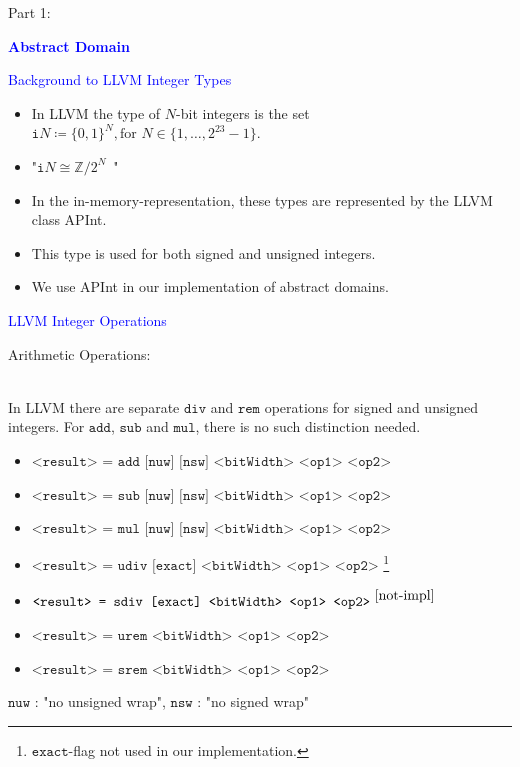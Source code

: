 \begin{frame}

Part 1:
\vspace{0.2cm}

{\LARGE \textbf{\textcolor{blue}{Abstract Domain}}}

\end{frame}




\begin{frame}[fragile]{\textcolor{blue}{Background to LLVM Integer Types}}
\begin{itemize}
\item In LLVM the type of $N$-bit integers is the set $\texttt{i}N \coloneqq \{0,1\}^N, \text{for~} N \in \{1,\dots, 2^{23}-1\}$.
\item "$\texttt{i}N \cong \mathbb{Z}/2^N$~" 
\item In the in-memory-representation, these types are represented by the LLVM class APInt.
\item This type is used for both signed and unsigned integers.
 
\item We use APInt 	 in our implementation of abstract domains.

\end{itemize}

\end{frame}

\begin{frame}[fragile]{\textcolor{blue}{LLVM Integer Operations}}
\begin{large}Arithmetic Operations:\end{large} \\
In LLVM there are separate $\texttt{div}$ and $\texttt{rem}$ operations for signed and unsigned integers. 
For $\texttt{add}$, $\texttt{sub}$ and $\texttt{mul}$, there is no such distinction needed.
\begin{itemize}
\item $\texttt{<result> = add [nuw] [nsw] <bitWidth> <op1> <op2>}$
\item $\texttt{<result> = sub [nuw] [nsw] <bitWidth> <op1> <op2>}$
\item $\texttt{<result> = mul [nuw] [nsw] <bitWidth> <op1> <op2>}$
\item $\texttt{<result> = udiv [exact] <bitWidth> <op1> <op2>}$ 
\footnote{\label{not-impl} $\texttt{exact}$-flag not used in our implementation.}
\item $\texttt{<result> = sdiv [exact] <bitWidth> <op1> <op2>} ^{~\ref{not-impl}}$
\item $\texttt{<result> = urem <bitWidth> <op1> <op2>}$
\item $\texttt{<result> = srem <bitWidth> <op1> <op2>}$
\end{itemize}

$\texttt{nuw}$ : "no unsigned wrap", $\texttt{nsw}$ : "no signed wrap"

\end{frame}

